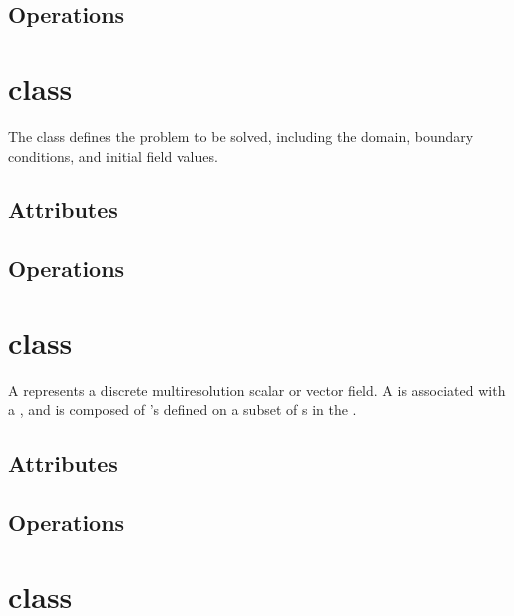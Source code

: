 \subsection{Operations}

\section{ class}

The  class defines the problem to be solved, including
the domain, boundary conditions, and initial field values.


\subsection{Attributes}

\subsection{Operations}

\section{ class} \label{ss:field}

A  represents a discrete multiresolution scalar or vector
field.  A  is associated with a , and is
composed of 's defined on a subset of s in the
.

\subsection{Attributes}

\subsection{Operations}

\section{ class}

